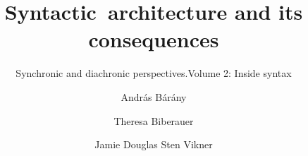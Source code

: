 \renewcommand{\lsSeries}{ogs}
\renewcommand{\lsSeriesNumber}{}

\title{Syntactic~architecture and its consequences}
\subtitle{Synchronic and diachronic perspectives.\newlineCover Volume 2: Inside syntax}
\author{András Bárány\and
Theresa Biberauer\and
Jamie Douglas\lastand
Sten Vikner}

\renewcommand{\lsCoverTitleFont}[1]{\sffamily\addfontfeatures{Scale=MatchUppercase}\fontsize{40pt}{13.5mm}\selectfont #1}

